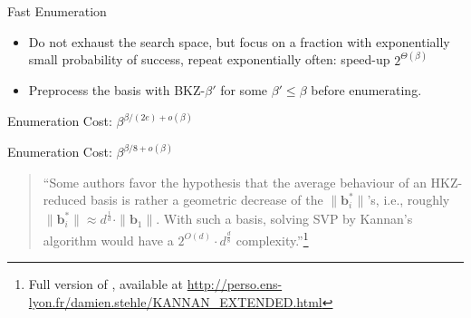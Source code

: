 \documentclass[table,10pt,aspectratio=169]{beamer}
\renewcommand{\vec}[1]{\ensuremath{\mathbf{#1}}\xspace}
\begin{document}
\begin{frame}[label={sec:orga167370}]{Fast Enumeration}
\begin{itemize}
\item Do not exhaust the search space, but focus on a fraction with exponentially small probability of success, repeat exponentially often: speed-up \(2^{\Theta(\beta)}\)
\item Preprocess the basis with BKZ-\(\beta'\) for some \(\beta' \leq \beta\) before enumerating.
\end{itemize}
\end{frame}

\begin{frame}[label={sec:orga157c85}]{Enumeration Cost: \(\beta^{\beta/(2e) + o(\beta)}\)}
\tikzset{external/export=true}
\tikzset{external/export=false}

\footnotesize {}
\end{frame}

\begin{frame}[label={sec:orgbce8a55}]{Enumeration Cost: \(\beta^{\beta/8 + o(\beta)}\)}
\begin{quote}
“Some authors favor the hypothesis that the average behaviour of an HKZ-reduced basis is rather a geometric decrease of the \(\|\vec{b}_i^{*}\|\)’s, i.e., roughly \(\|\vec{b}^*_i\| ≈ d^{\frac{i}{d}} \cdot \|\vec{b}_1\|\). With such a basis, solving SVP by Kannan’s algorithm would have a \(2^{O(d)} \cdot d^{\frac{d}{8}}\) complexity.”\footnote{Full version of , available at \url{http://perso.ens-lyon.fr/damien.stehle/KANNAN\_EXTENDED.html}}
\end{quote}
\end{frame}
\end{document}
